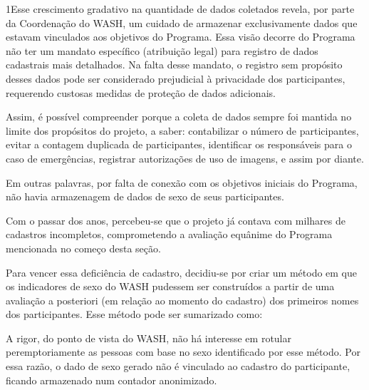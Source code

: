 1Esse crescimento gradativo na quantidade de dados coletados revela, por parte da Coordenação do WASH, um cuidado de armazenar exclusivamente dados que estavam vinculados aos objetivos do Programa. Essa visão decorre do Programa não ter um mandato específico (atribuição legal) para registro de dados cadastrais mais detalhados. Na falta desse mandato, o registro sem propósito desses dados pode ser considerado prejudicial à privacidade dos participantes, requerendo custosas medidas de proteção de dados adicionais.

Assim, é possível compreender porque a coleta de dados sempre foi mantida no limite dos propósitos do projeto, a saber: contabilizar o número de participantes, evitar a contagem duplicada de participantes, identificar os responsáveis para o caso de emergências, registrar autorizações de uso de imagens, e assim por diante.

Em outras palavras, por falta de conexão com os objetivos iniciais do Programa, não havia armazenagem de dados de sexo de seus participantes.

Com o passar dos anos, percebeu-se que o projeto já contava com milhares de cadastros incompletos, comprometendo a avaliação equânime do Programa mencionada no começo desta seção.

Para vencer essa deficiência de cadastro, decidiu-se por criar um método em que os indicadores de sexo do WASH pudessem ser construídos a partir de uma avaliação a posteriori (em relação ao momento do cadastro) dos primeiros nomes dos participantes. Esse método pode ser sumarizado como:


\noindent\begin{center}\mbox{\centering{}}\end{center}


A rigor, do ponto de vista do WASH, não há interesse em rotular peremptoriamente as pessoas com base no sexo identificado por esse método. Por essa razão, o dado de sexo gerado não é vinculado ao cadastro do participante, ficando armazenado num contador anonimizado.


